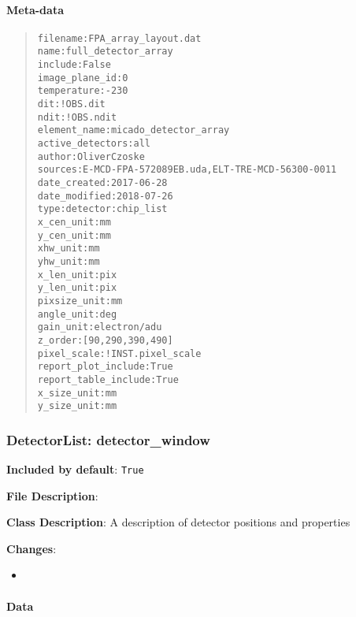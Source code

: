 \documentclass[a4paper]{article}
\begin{document}
\paragraph{Meta-data%
  \label{id24}%
}

\begin{quote}
\begin{alltt}
            filename : FPA_array_layout.dat
                name : full_detector_array
             include : False
      image_plane_id : 0
         temperature : -230
                 dit : !OBS.dit
                ndit : !OBS.ndit
        element_name : micado_detector_array
    active_detectors : all
              author : Oliver Czoske
             sources : E-MCD-FPA-572089EB.uda, ELT-TRE-MCD-56300-0011
        date_created : 2017-06-28
       date_modified : 2018-07-26
                type : detector:chip_list
          x_cen_unit : mm
          y_cen_unit : mm
            xhw_unit : mm
            yhw_unit : mm
          x_len_unit : pix
          y_len_unit : pix
        pixsize_unit : mm
          angle_unit : deg
           gain_unit : electron/adu
             z_order : [90, 290, 390, 490]
         pixel_scale : !INST.pixel_scale
 report_plot_include : True
report_table_include : True
         x_size_unit : mm
         y_size_unit : mm
\end{alltt}
\end{quote}


\subsubsection{DetectorList: \textquotedbl{}detector\_window\textquotedbl{}%
  \label{detectorlist-detector-window}%
}

\textbf{Included by default}: \texttt{True}

\textbf{File Description}:

\textbf{Class Description}: A description of detector positions and properties

\textbf{Changes}:

\begin{itemize}
\item \end{itemize}


\paragraph{Data%
  \label{id25}%
}

\begin{figure}
\noindent{}\label{fig-detector-window}
\end{figure}
\end{document}
